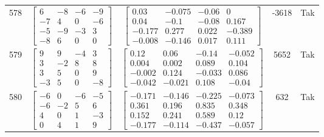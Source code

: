 \documentclass[a4paper,12pt]{article}
\begin{document}
\begin{tabular}{c c c c c}
578
&
$\begin{bmatrix} 6 & -8 & -6 & -9 \\ -7 & 4 & 0 & -6 \\ -5 & -9 & -3 & 3 \\ -8 & 6 & 0 & 0 \end{bmatrix}$
&
$\begin{bmatrix} 0.03 & -0.075 & -0.06 & 0 \\ 0.04 & -0.1 & -0.08 & 0.167 \\ -0.177 & 0.277 & 0.022 & -0.389 \\ -0.008 & -0.146 & 0.017 & 0.111 \end{bmatrix}$
&
-3618
&
Tak
\\
579
&
$\begin{bmatrix} 9 & 9 & -4 & 3 \\ 3 & -2 & 8 & 8 \\ 3 & 5 & 0 & 9 \\ -3 & 5 & 0 & -8 \end{bmatrix}$
&
$\begin{bmatrix} 0.12 & 0.06 & -0.14 & -0.052 \\ 0.004 & 0.002 & 0.089 & 0.104 \\ -0.002 & 0.124 & -0.033 & 0.086 \\ -0.042 & -0.021 & 0.108 & -0.04 \end{bmatrix}$
&
5652
&
Tak
\\
580
&
$\begin{bmatrix} -6 & 0 & -6 & -5 \\ -6 & -2 & 5 & 6 \\ 4 & 0 & 1 & -3 \\ 0 & 4 & 1 & 9 \end{bmatrix}$
&
$\begin{bmatrix} -0.171 & -0.146 & -0.225 & -0.073 \\ 0.361 & 0.196 & 0.835 & 0.348 \\ 0.152 & 0.241 & 0.589 & 0.12 \\ -0.177 & -0.114 & -0.437 & -0.057 \end{bmatrix}$
&
632
&
Tak
\\
\end{tabular} \egroup \newpage
\end{document}
